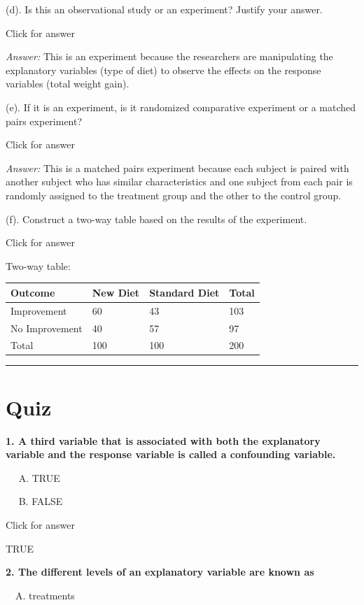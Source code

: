 \documentclass[
]{book}
\begin{document}
(d). Is this an observational study or an experiment? Justify your answer.

Click for answer

\emph{Answer:} This is an experiment because the researchers are manipulating the explanatory variables (type of diet) to observe the effects on the response variables (total weight gain).

(e). If it is an experiment, is it randomized comparative experiment or a matched pairs experiment?

Click for answer

\emph{Answer:} This is a matched pairs experiment because each subject is paired with another subject who has similar characteristics and one subject from each pair is randomly assigned to the treatment group and the other to the control group.

(f). Construct a two-way table based on the results of the experiment.

Click for answer

Two-way table:

\begin{longtable}[]{@{}llll@{}}
\toprule()
Outcome & New Diet & Standard Diet & Total \\
\midrule()
\endhead
Improvement & 60 & 43 & 103 \\
No Improvement & 40 & 57 & 97 \\
Total & 100 & 100 & 200 \\
\bottomrule()
\end{longtable}

\begin{center}\rule{0.5\linewidth}{0.5pt}\end{center}

\hypertarget{quiz-2}{%
\section{Quiz}\label{quiz-2}}

\textbf{1. A third variable that is associated with both the explanatory variable and the response variable is called a confounding variable.}

  A. TRUE

  B. FALSE

Click for answer

TRUE

\textbf{2. The different levels of an explanatory variable are known as }

 A. treatments
\end{document}
